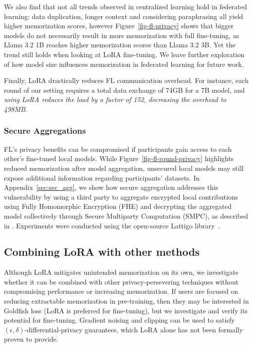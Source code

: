 We also find that not all trends observed in centralized learning hold in federated learning: data duplication, longer context and considering paraphrasing all yield higher memorization scores, however Figure~\ref{fig-fl-privacy} shows that bigger models do not necessarily result in more memorization with full fine-tuning, as Llama 3.2 1B reaches higher memorization scores than Llama 3.2 3B. Yet the trend still holds when looking at LoRA fine-tuning. We leave further exploration of how model size influences memorization in federated learning for future work.

Finally, LoRA drastically reduces FL communication overhead. For instance, each round of our setting requires a total data exchange of 74GB for a 7B model, and \textit{using LoRA reduces the load by a factor of 152, decreasing the overhead to 498MB}.

\subsubsection{Secure Aggregations}
FL's privacy benefits can be compromised if participants gain access to each other's fine-tuned local models. While Figure~\ref{fig-fl-round-privacy} highlights reduced memorization after model aggregation, unsecured local models may still expose additional information regarding participants' datasets. In Appendix~\ref{sec:sec_agg}, we show how secure aggregation addresses this vulnerability by using a third party to aggregate encrypted local contributions using Fully Homomorphic Encryption (FHE) and decrypting the aggregated model collectively through Secure Multiparty Computation (SMPC), as described in \citet{sebert2022fhedp}. Experiments were conducted using the open-source Lattigo library~\citep{lattigo, mouchet2020lattigo}.

\subsection{Combining LoRA with other methods}

Although LoRA mitigates unintended memorization on its own, we investigate whether it can be combined with other privacy-persevering techniques without compromising performance or increasing memorization. If users are focused on reducing extractable memorization in pre-training, then they may be interested in Goldfish loss (LoRA is preferred for fine-tuning), but we investigate and verify its potential for fine-tuning. Gradient noising and clipping can be used to satisfy $(\epsilon, \delta)$-differential-privacy guarantees, which LoRA alone has not been formally proven to provide.

